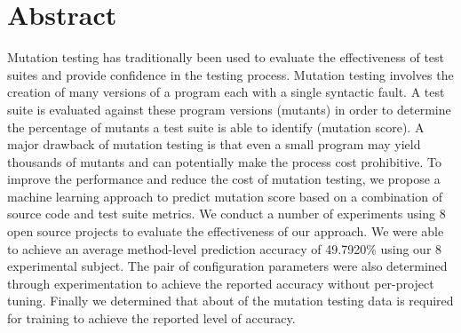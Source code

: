 \chapter*{Abstract}
Mutation testing has traditionally been used to evaluate the effectiveness of test suites and provide confidence in the testing process. Mutation testing involves the creation of many versions of a program each with a single syntactic fault. A test suite is evaluated against these program versions (mutants) in order to determine the percentage of mutants a test suite is able to identify (mutation score). A major drawback of mutation testing is that even a small program may yield thousands of mutants and can potentially make the process cost prohibitive. To improve the performance and reduce the cost of mutation testing, we propose a machine learning approach to predict mutation score based on a combination of source code and test suite metrics. We conduct a number of experiments using 8 open source projects to evaluate the effectiveness of our approach. We were able to achieve an average method-level prediction accuracy of 49.7920\% using our 8 experimental subject. The pair of configuration parameters were also determined through experimentation to achieve the reported accuracy without per-project tuning. Finally we determined that about  of the mutation testing data is required for training to achieve the reported level of accuracy.